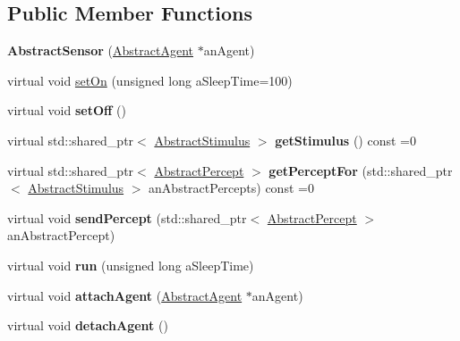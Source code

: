 \subsection*{Public Member Functions}
\begin{DoxyCompactItemize}
\item 
{\bfseries Abstract\+Sensor} (\hyperlink{class_model_1_1_abstract_agent}{Abstract\+Agent} $\ast$an\+Agent)\hypertarget{class_model_1_1_abstract_sensor_a787a53fde6320acca0a3500221f11bf4}{}\label{class_model_1_1_abstract_sensor_a787a53fde6320acca0a3500221f11bf4}

\item 
virtual void \hyperlink{class_model_1_1_abstract_sensor_a958bad26decf903bb28fd45bc835c7bb}{set\+On} (unsigned long a\+Sleep\+Time=100)
\item 
virtual void {\bfseries set\+Off} ()\hypertarget{class_model_1_1_abstract_sensor_a31f0eb53ed8252c45e4ac64ea328d7b9}{}\label{class_model_1_1_abstract_sensor_a31f0eb53ed8252c45e4ac64ea328d7b9}

\item 
virtual std\+::shared\+\_\+ptr$<$ \hyperlink{class_model_1_1_abstract_stimulus}{Abstract\+Stimulus} $>$ {\bfseries get\+Stimulus} () const =0\hypertarget{class_model_1_1_abstract_sensor_a63ae4aa9e8ac1592f48dbdb1b734ddde}{}\label{class_model_1_1_abstract_sensor_a63ae4aa9e8ac1592f48dbdb1b734ddde}

\item 
virtual std\+::shared\+\_\+ptr$<$ \hyperlink{class_model_1_1_abstract_percept}{Abstract\+Percept} $>$ {\bfseries get\+Percept\+For} (std\+::shared\+\_\+ptr$<$ \hyperlink{class_model_1_1_abstract_stimulus}{Abstract\+Stimulus} $>$ an\+Abstract\+Percepts) const =0\hypertarget{class_model_1_1_abstract_sensor_ac9254468d847d18b0895b9fa29fb7871}{}\label{class_model_1_1_abstract_sensor_ac9254468d847d18b0895b9fa29fb7871}

\item 
virtual void {\bfseries send\+Percept} (std\+::shared\+\_\+ptr$<$ \hyperlink{class_model_1_1_abstract_percept}{Abstract\+Percept} $>$ an\+Abstract\+Percept)\hypertarget{class_model_1_1_abstract_sensor_a2b0fb54fe519b4c58187b939ec612eb0}{}\label{class_model_1_1_abstract_sensor_a2b0fb54fe519b4c58187b939ec612eb0}

\item 
virtual void {\bfseries run} (unsigned long a\+Sleep\+Time)\hypertarget{class_model_1_1_abstract_sensor_ab85ffa9f6dbdf249681ed95a052bf017}{}\label{class_model_1_1_abstract_sensor_ab85ffa9f6dbdf249681ed95a052bf017}

\item 
virtual void {\bfseries attach\+Agent} (\hyperlink{class_model_1_1_abstract_agent}{Abstract\+Agent} $\ast$an\+Agent)\hypertarget{class_model_1_1_abstract_sensor_ad78d0c553f653f564fbbe222a1a8bd81}{}\label{class_model_1_1_abstract_sensor_ad78d0c553f653f564fbbe222a1a8bd81}

\item 
virtual void {\bfseries detach\+Agent} ()\hypertarget{class_model_1_1_abstract_sensor_ab6bc01195b77d486d7ea628f731416db}{}\label{class_model_1_1_abstract_sensor_ab6bc01195b77d486d7ea628f731416db}

\end{DoxyCompactItemize}
